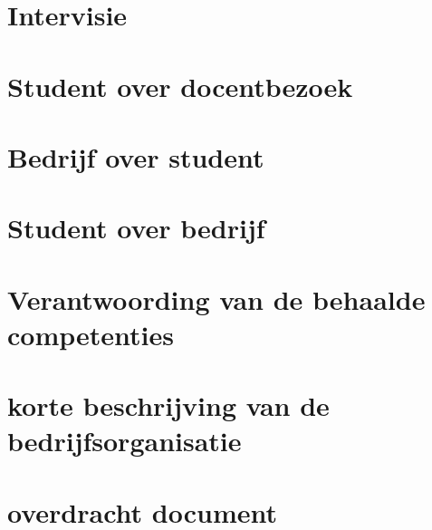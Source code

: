 \documentclass{mimosis}
\begin{document}
\begin{appendices}
\appendixpage
\noappendicestocpagenum
\addappheadtotoc
\chapter{Intervisie}

\chapter{Student over docentbezoek}

\chapter{Bedrijf over student}

\chapter{Student over bedrijf}

\chapter{Verantwoording van de behaalde competenties}

\chapter{korte beschrijving van de bedrijfsorganisatie}

\chapter{overdracht document}
\label{overdracht}

\end{appendices}

\backmatter
\end{document}
